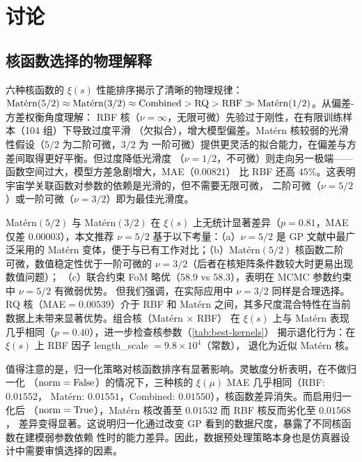 \chapter{讨论}\label{chap:discussion}

\section{核函数选择的物理解释}\label{sec:physics-interp}

六种核函数的 $\xi(s)$ 性能排序揭示了清晰的物理规律：
$\mathrm{Mat\acute{e}rn}(5/2)\approx\mathrm{Mat\acute{e}rn}(3/2)\approx{\rm Combined}
> {\rm RQ} > {\rm RBF} \gg \mathrm{Mat\acute{e}rn}(1/2)$。从偏差-方差权衡角度理解：
RBF 核（$\nu=\infty$，无限可微）先验过于刚性，在有限训练样本（104 组）下导致过度平滑
（欠拟合），增大模型偏差。Mat\'ern 核较弱的光滑性假设（$5/2$ 为二阶可微，$3/2$ 为
一阶可微）提供更灵活的拟合能力，在偏差与方差间取得更好平衡。但过度降低光滑度
（$\nu=1/2$，不可微）则走向另一极端——函数空间过大，模型方差急剧增大，MAE（$0.00821$）
比 RBF 还高 $45\%$。这表明宇宙学关联函数对参数的依赖是光滑的，但不需要无限可微，
二阶可微（$\nu=5/2$）或一阶可微（$\nu=3/2$）即为最佳光滑度。

Mat\'ern$(5/2)$ 与 Mat\'ern$(3/2)$ 在 $\xi(s)$ 上无统计显著差异（$p=0.81$，MAE 仅差
$0.00003$），本文推荐 $\nu=5/2$ 基于以下考量：（a）$\nu=5/2$ 是 GP 文献中最广泛采用的
Mat\'ern 变体\cite{Rasmussen2006}，便于与已有工作对比；（b）Mat\'ern$(5/2)$ 核函数二阶
可微，数值稳定性优于一阶可微的 $\nu=3/2$（后者在核矩阵条件数较大时更易出现数值问题）；
（c）联合约束 FoM 略优（$58.9$ vs $58.3$），表明在 MCMC 参数约束中 $\nu=5/2$ 有微弱优势。
但我们强调，在实际应用中 $\nu=3/2$ 同样是合理选择。RQ 核（MAE${}=0.00539$）介于 RBF 和
Mat\'ern 之间，其多尺度混合特性在当前数据上未带来显著优势。组合核（Mat\'ern $\times$ RBF）
在 $\xi(s)$ 上与 Mat\'ern 表现几乎相同（$p=0.40$），进一步检查核参数（\autoref{tab:best-kernels}）
揭示退化行为：在 $\xi(s)$ 上 RBF 因子 length\_scale ${}=9.8\times 10^{4}$（常数），
退化为近似 Mat\'ern 核。

值得注意的是，归一化策略对核函数排序有显著影响。灵敏度分析表明，在不做归一化
（${\rm norm}={\rm False}$）的情况下，三种核的 $\xi(\mu)$ MAE 几乎相同（RBF: $0.01552$，
Mat\'ern: $0.01551$，Combined: $0.01550$），核函数差异消失。而启用归一化后
（${\rm norm}={\rm True}$），Mat\'ern 核改善至 $0.01532$ 而 RBF 核反而劣化至 $0.01568$，
差异变得显著。这说明归一化通过改变 GP 看到的数据尺度，暴露了不同核函数在建模弱参数依赖
性时的能力差异。因此，数据预处理策略本身也是仿真器设计中需要审慎选择的因素。

